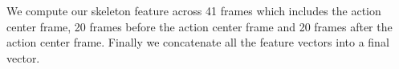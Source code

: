 \documentclass[10pt,twocolumn,letterpaper]{article}
\begin{document}
We compute our skeleton feature across 41 frames which includes the action center frame, 20 frames before the action center frame and 20 frames after the action center frame. Finally we concatenate all the feature vectors into a final vector.

%
%
%
%
%
%
%
\end{document}

